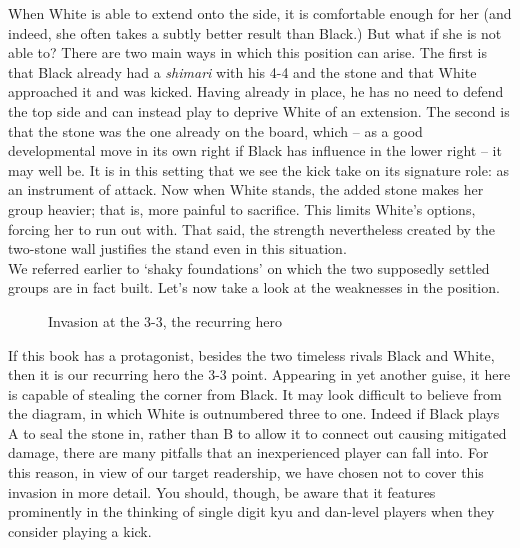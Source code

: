 \documentclass[a5paper,12pt,twoside]{book} %
\begin{document}
When White is able to extend onto the side, it is comfortable enough for her (and indeed, she often takes a subtly better result than Black.) But what if she is not able to? There are two main ways in which this position can arise. The first is that Black already had a \textit{shimari} with his 4-4 and the{\large\blackstone[\igotriangle]} stone and that White approached it and was kicked. Having{\large\blackstone[\igotriangle]} already in place, he has no need to defend the top side and can instead play{\large\blackstone[\igocross]} to deprive White of an extension. The second is that the{\large\blackstone[\igocross]} stone was the one already on the board, which – as a good developmental move in its own right if Black has influence in the lower right – it may well be. It is in this setting that we see the kick take on its signature role: as an instrument of attack. Now when White stands, the added stone makes her group heavier; that is, more painful to sacrifice. This limits White's options, forcing her to run out with{\large\whitestone[1]}. That said, the strength nevertheless created by the two-stone wall justifies the stand even in this situation.\\

We referred earlier to `shaky foundations' on which the two supposedly settled groups are in fact built. Let's now take a look at the weaknesses in the position.\\

\begin{figure}[!htbp]
 
\vspace{-0.6cm}\caption{Invasion at the 3-3, the recurring hero}
\label{4-4:kick-5}
\end{figure}

If this book has a protagonist, besides the two timeless rivals Black and White, then it is our recurring hero the 3-3 point. Appearing in yet another guise, it here is capable of stealing the corner from Black. It may look difficult to believe from the diagram, in which White is outnumbered three to one. Indeed if Black plays A to seal the stone in, rather than B to allow it to connect out causing mitigated damage, there are many pitfalls that an inexperienced player can fall into. For this reason, in view of our target readership, we have chosen not to cover this invasion in more detail. You should, though, be aware that it features prominently in the thinking of single digit kyu and dan-level players when they consider playing a kick.\\
\end{document}
